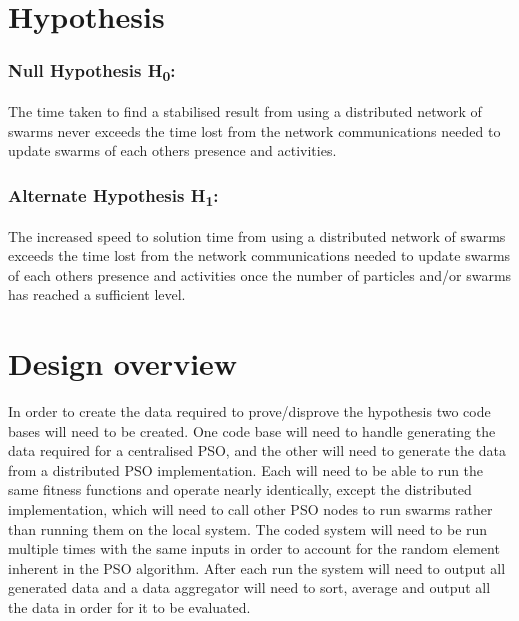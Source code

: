\documentclass[oneside,12pt]{book}
\begin{document}
\section{Hypothesis}
\subsubsection{Null Hypothesis H\textsubscript{0}:}
The time taken to find a stabilised result from using a distributed network of swarms never exceeds the time lost from the network communications needed to update swarms of each others presence and activities.

\subsubsection{Alternate Hypothesis H\textsubscript{1}:}
The increased speed to solution time from using a distributed network of swarms exceeds the time lost from the network communications needed to update swarms of each others presence and activities once the number of particles and/or swarms has reached a sufficient level.

\section{Design overview}
In order to create the data required to prove/disprove the hypothesis two code bases will need to be created. One code base will need to handle generating the data required for a centralised PSO, and the other will need to generate the data from a distributed PSO implementation. Each will need to be able to run the same fitness functions and operate nearly identically, except the distributed implementation, which will need to call other PSO nodes to run swarms rather than running them on the local system. 
The coded system will need to be run multiple times with the same inputs in order to account for the random element inherent in the PSO algorithm. After each run the system will need to output all generated data and a data aggregator will need to sort, average and output all the data in order for it to be evaluated.
\end{document}
